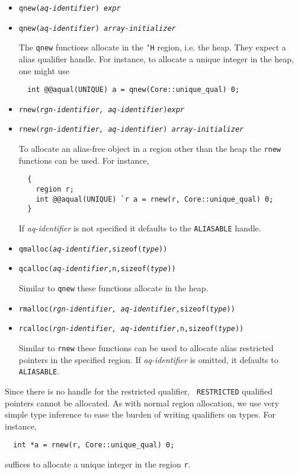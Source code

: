 \begin{itemize}
\item \texttt{qnew({\it aq-identifier}) {\it expr}}
\item \texttt{qnew({\it aq-identifier}) {\it array-initializer}}

The {\tt qnew} functions allocate in the {\tt `H} region, i.e. the
 heap. They expect a alias qualifier handle. For instance, to allocate
 a unique integer in the heap, one might use

\begin{verbatim}
  int @@aqual(UNIQUE) a = qnew(Core::unique_qual) 0;
\end{verbatim}

\item \texttt{rnew({\it rgn-identifier, aq-identifier}){\it expr}}
\item \texttt{rnew({\it rgn-identifier, aq-identifier}){\it
    array-initializer}} 

To allocate an alias-free object in a region other than the heap the
{\tt rnew} functions can be used. For instance,

\begin{verbatim}
  {
    region r;
    int @@aqual(UNIQUE) `r a = rnew(r, Core::unique_qual) 0;
  }
\end{verbatim}
   
If {\it aq-identifier} is not specified it defaults to the {\tt ALIASABLE}
handle.

\item \texttt{qmalloc({\it aq-identifier},sizeof({\it type}))}
\item \texttt{qcalloc({\it aq-identifier},n,sizeof({\it type}))}

Similar to {\tt qnew} these functions allocate in the heap.

\item \texttt{rmalloc({\it rgn-identifier, aq-identifier},sizeof({\it type}))}
\item \texttt{rcalloc({\it rgn-identifier,
    aq-identifier},n,sizeof({\it type}))}

Similar to {\tt rnew} these functions can be used to allocate alias
restricted pointers in the specified region. If {\it aq-identifier} is
omitted, it defaults to {\tt ALIASABLE}.
\end{itemize}

Since there is no handle for the restricted qualifier, {\tt
  RESTRICTED} qualified pointers cannot be allocated. As with normal
  region allocation, we use very simple type inference to ease the
  burden of writing qualifiers on types. For instance,
\begin{verbatim}
  int *a = rnew(r, Core::unique_qual) 0;
\end{verbatim}
suffices to allocate a unique integer in the region {\tt r}.

